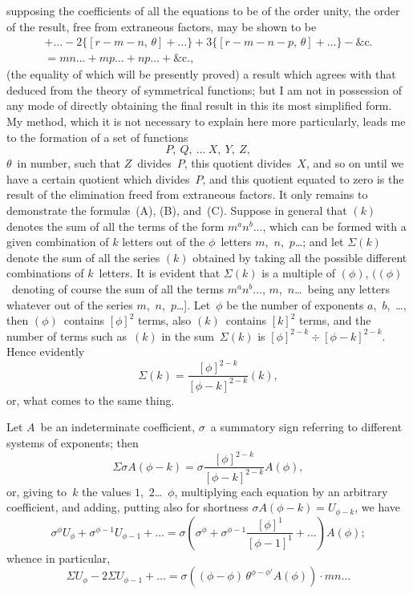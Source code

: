 \documentclass[11pt,a4paper]{article}
\begin{document}
\newpage
supposing the coefficients of all the equations to be of the order unity, the order of the result, free from extraneous factors, may be shown to be
\begin{multline*}
[r-m,\,\theta] + \ldots - 2\{[r-m-n,\,\theta] + \ldots\} + 3\{[r-m-n-p,\,\theta] + \ldots\} - \text{\&c.} \\
= mn\ldots + mp\ldots + np\ldots + \text{\&c.} \tag{C},
\end{multline*}
(the equality of which will be presently proved) a result which agrees with that deduced from the theory of symmetrical functions; but I am not in possession of any mode of directly obtaining the final result in this its most simplified form. My method, which it is not necessary to explain here more particularly, leads me to the formation of a set of functions
\[
P,\ Q,\ \ldots\ X,\ Y,\ Z,
\]
$\theta$~in number, such that $Z$~divides~$P$, this quotient divides~$X$, and so on until we have a certain quotient which divides~$P$, and this quotient equated to zero is the result of the elimination freed from extraneous factors. It only remains to demonstrate the formul\ae\ (A), (B), and~(C). Suppose in general that $(k)$ denotes the sum of all the terms of the form $m^a n^b \ldots$, which can be formed with a given combination of $k$ letters out of the $\phi$~letters $m$,~$n$,~$p$\ldots; and let $\Sigma(k)$ denote the sum of all the series $(k)$ obtained by taking all the possible different combinations of $k$~letters. It is evident that $\Sigma(k)$ is a multiple of $(\phi)$, $((\phi)$~denoting of course the sum of all the terms $m^a n^b \ldots$, $m$,~$n$\ldots\ being any letters whatever out of the series $m$,~$n$,~$p$\ldots]. Let~$\phi$ be the number of exponents $a$,~$b$,~\ldots, then $(\phi)$~contains $[\phi]^2$ terms, also $(k)$~contains $[k]^2$ terms, and the number of terms such as~$(k)$ in the sum~$\Sigma(k)$ is $[\phi]^{2-k} \div [\phi-k]^{2-k}$. Hence evidently
\[
\Sigma(k) = \frac{[\phi]^{2-k}}{[\phi-k]^{2-k}} (k),
\]
or, what comes to the same thing.

Let $A$~be an indeterminate coefficient, $\sigma$~a summatory sign referring to different systems of exponents; then
\[
\Sigma\sigma A(\phi-k) = \sigma\frac{[\phi]^{2-k}}{[\phi-k]^{2-k}} A(\phi),
\]
or, giving to~$k$ the values $1$,~$2$\ldots~$\phi$, multiplying each equation by an arbitrary coefficient, and adding, putting also for shortness $\sigma A(\phi-k) = U_{\phi-k}$, we have
\[
\sigma^\phi U_\phi + \sigma^{\phi-1} U_{\phi-1} + \ldots = \sigma\left(\sigma^\phi + \sigma^{\phi-1}\frac{[\phi]^1}{[\phi-1]^1} + \ldots\right) A(\phi);
\]
whence in particular,
\[
\Sigma U_\phi - 2\Sigma U_{\phi-1} + \ldots = \sigma\left((\phi-\phi)\,\theta^{\phi-\phi'} A(\phi)\right) \cdot mn\ldots
\]
\end{document}
